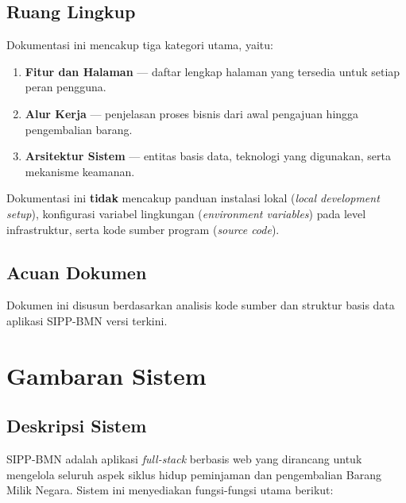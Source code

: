 \documentclass[
  12pt,
  a4paper,
  oneside,
  final
]{report}
\begin{document}
\section{Ruang Lingkup}
Dokumentasi ini mencakup tiga kategori utama, yaitu:
\begin{enumerate}
  \item {\bfseries Fitur dan Halaman} --- daftar lengkap halaman yang
        tersedia untuk setiap peran pengguna.
  \item {\bfseries Alur Kerja} --- penjelasan proses bisnis dari awal
        pengajuan hingga pengembalian barang.
  \item {\bfseries Arsitektur Sistem} --- entitas basis data, teknologi
        yang digunakan, serta mekanisme keamanan.
\end{enumerate}

Dokumentasi ini {\bfseries tidak} mencakup panduan instalasi lokal
({\it local development setup}), konfigurasi variabel lingkungan
({\it environment variables}) pada level infrastruktur, serta kode
sumber program ({\it source code}).

\section{Acuan Dokumen}
Dokumen ini disusun berdasarkan analisis kode sumber dan struktur basis
data aplikasi SIPP-BMN versi terkini.

\chapter{Gambaran Sistem}

\section{Deskripsi Sistem}
SIPP-BMN adalah aplikasi {\it full-stack} berbasis web yang dirancang
untuk mengelola seluruh aspek siklus hidup peminjaman dan pengembalian
Barang Milik Negara. Sistem ini menyediakan fungsi-fungsi utama berikut:
\end{document}
